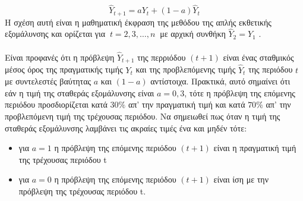 \begin{equation}
\widehat{Y}_{t + 1} = aY_t + \left( 1 − a \right) \widehat{Y}_t 
\end{equation}
Η σχέση αυτή είναι η μαθηματική έκφραση της μεθόδου της απλής εκθετικής
εξομάλυνσης και ορίζεται για $\:t=2,3,\ldots,n\:$ με αρχική συνθήκη $\widehat{Y}_2 = Y_1$ .\\\\
Είναι προφανές ότι η πρόβλεψη $ \widehat{Y}_{t+1}$ της περριόδου $\left( t+1 \right)$ είναι ένας σταθμικός μέσος όρος της πραγματικής τιμής $ Y_t$ και της προβλεπόμενης τιμής $ \widehat{Y}_t$ 
της περιόδου $t$ με συντελεστές βαύτητας $a$ και $\left(1-a \right)$ αντίστοιχα. Πρακτικά, αυτό σημαίνει ότι εάν η τιμή της σταθεράς εξομάλυνσης  είναι $ a=0,3 $, τότε η πρόβλεψη της επόμενης περιόδου προσδιορίζεται κατά $30 \%$ απ' την πραγματική τιμή και κατά $70 \%$ απ' την προβλεπόμενη τιμή της τρέχουσας περιόδου. Να σημειωθεί πως όταν η τιμή της σταθεράς εξομάλυνσης λαμβάνει τις ακραίες τιμές ένα και μηδέν τότε: \\
\begin{itemize}
\item για $a=1$ η πρόβλεψη της επόμενης περιόδου $\left(t+1\right)$ είναι η πραγματική τιμή της τρέχουσας περιόδου t 
\item για $a=0$ η πρόβλεψη της επόμενης περιόδου $\left(t+1\right)$ είναι ίση με την
πρόβλεψη της τρέχουσας περιόδου t.
\end{itemize}

